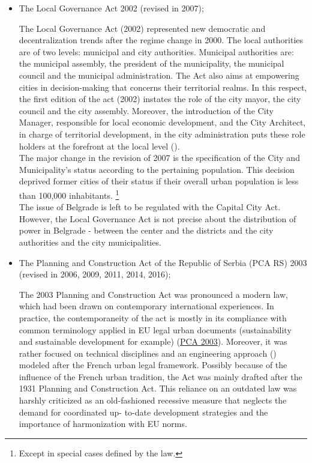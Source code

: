 \documentclass[11pt]{report}
\begin{document}
\begin{itemize}
\item The Local Governance Act 2002 (revised in 2007);

The Local Governance Act (2002) represented new democratic and decentralization trends after the regime change in 2000. The local authorities are of two levels: municipal and city authorities. Municipal authorities are: the municipal assembly, the president of the municipality, the municipal council and the municipal administration. The Act also aims at empowering cities in decision-making that concerns their territorial realms. In this respect, the first edition of the act (2002) instates the role of the city mayor, the city council and the city assembly. Moreover, the introduction of the City Manager, responsible for local economic development, and the City Architect, in charge of territorial development, in the city administration puts these role holders at the forefront at the local level (\href{Vujovic}{\citealt{vujovic_belgrades_2007}}).
\\

The major change in the revision of 2007 is the specification of the City and Municipality’s status according to the pertaining population. This decision deprived former cities of their status if their overall urban population is less than 100,000 inhabitants.
\footnote{Except in special cases defined by the law.}
\\
The issue of Belgrade is left to be regulated with the Capital City Act.
However, the Local Governance Act is not precise about the distribution of power in Belgrade - between the center and the districts and the city authorities and the city municipalities.

\item The Planning and Construction Act of the Republic of Serbia (PCA RS) 2003 (revised in 2006, 2009, 2011, 2014, 2016);

The 2003 Planning and Construction Act was pronounced a modern law, which had been drawn on contemporary international experiences. In practice, the contemporaneity of the act is mostly in its compliance with common terminology applied in EU legal urban documents (sustainability and sustainable development for example) (\href{Zakon}{PCA 2003}).
Moreover, it was rather focused on technical disciplines and an engineering approach (\href{Nedovic}{\citealt{nedovicbudic_waves_2006}}) modeled after the French urban legal framework.
Possibly because of the influence of the French urban tradition, the Act was mainly drafted after the 1931 Planning and Construction Act. This reliance on an outdated law was harshly criticized as an old-fashioned recessive measure that neglects the demand for coordinated up- to-date development strategies and the importance of harmonization with EU norms.
\\


\end{itemize}
\end{document}
